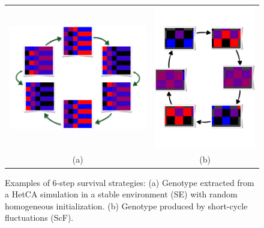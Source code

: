 \begin{figure}[h]
\centering
\begin{tabular}{cc}
\includegraphics[width=0.45\columnwidth]{img/4steptransition}& \includegraphics[width=0.45\columnwidth]{img/cyclesReal}\\
(a) & (b)
\end{tabular}
\caption{Examples of 6-step survival strategies: (a) Genotype extracted from a HetCA simulation in a stable environment (SE) with random homogeneous initialization. (b) Genotype produced by short-cycle fluctuations (ScF).}
\label{foursteps}
\end{figure}

